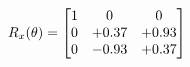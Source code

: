 \documentclass[preview]{standalone}
\begin{document}
\begin{align*}
\special{dvisvgm:raw <g id='unique000'>}R_{x}(\theta) = \begin{bmatrix}1 & 0 & 0 \\0 & +0.37 & +0.93 \\0 & -0.93 & +0.37\end{bmatrix}\special{dvisvgm:raw </g>}
\end{align*}
\end{document}
